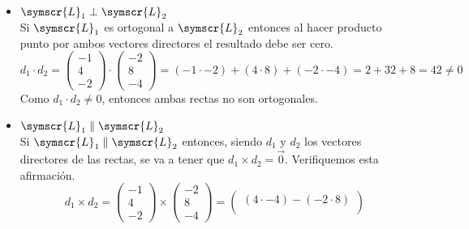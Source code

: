 \documentclass{article}
\def\fancyL{\symscr{L}}
\begin{document}
\begin{enumerate}
\begin{itemize}
            \begin{itemize}
                \item \(\fancyL_1 \perp \fancyL_2\) \\
                    Si \(\fancyL_1\) es ortogonal a \(\fancyL_2\) entonces al hacer producto punto por ambos vectores directores el resultado debe ser cero.
                    \[
                        d_1 \cdot d_2 =
                        \begin{pmatrix}
                            -1 \\ 4 \\ -2
                        \end{pmatrix}
                        \cdot
                        \begin{pmatrix}
                            -2 \\ 8 \\ -4
                        \end{pmatrix}
                        =
                        (-1 \cdot -2) + (4 \cdot 8) + (-2 \cdot -4)
                        =
                        2 + 32 + 8
                        =
                        42
                        \neq
                        0
                    \]
                    Como \(d_1 \cdot d_2 \neq 0\), entonces ambas rectas no son ortogonales.
                \item \(\fancyL_1 \parallel \fancyL_2\) \\
                    Si \(\fancyL_1 \parallel \fancyL_2\) entonces, siendo \(d_1\) y \(d_2\) los vectores directores de las rectas, se va a tener que
                    \(d_1 \times d_2 = \vec{0}\). Verifiquemos esta afirmación.
                    \[
                        d_1 \times d_2
                        =
                        \begin{pmatrix}
                            -1 \\ 4 \\ -2
                        \end{pmatrix}
                        \times
                        \begin{pmatrix}
                            -2 \\ 8 \\ -4
                        \end{pmatrix}
                        =
                        \begin{pmatrix}
                            (4 \cdot -4) - (-2 \cdot 8) \\

\end{pmatrix}\]
\end{itemize}
\end{itemize}
\end{enumerate}
\end{document}
